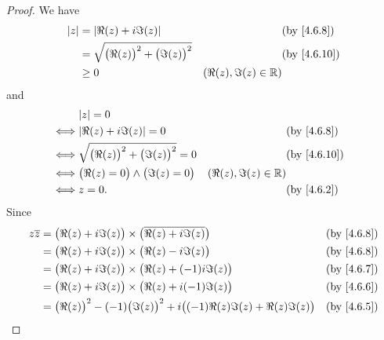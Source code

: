 \begin{proof}
  We have
  \begin{align*}
    \abs{z} & = \abs{\Re(z) + i \Im(z)}                        &                         & \text{(by \cref{4.6.8})}  \\
            & = \sqrt{\big(\Re(z)\big)^2 + \big(\Im(z)\big)^2} &                         & \text{(by \cref{4.6.10})} \\
            & \geq 0                                           & (\Re(z), \Im(z) \in \R)
  \end{align*}
  and
  \begin{align*}
         & \abs{z} = 0                                                                                              \\
    \iff & \abs{\Re(z) + i \Im(z)} = 0                        &                         & \text{(by \cref{4.6.8})}  \\
    \iff & \sqrt{\big(\Re(z)\big)^2 + \big(\Im(z)\big)^2} = 0 &                         & \text{(by \cref{4.6.10})} \\
    \iff & \big(\Re(z) = 0\big) \land \big(\Im(z) = 0\big)    & (\Re(z), \Im(z) \in \R)                             \\
    \iff & z = 0.                                             &                         & \text{(by \cref{4.6.2})}
  \end{align*}
  Since
  \begin{align*}
    z \overline{z} & = \big(\Re(z) + i \Im(z)\big) \times \big(\overline{\Re(z) + i \Im(z)}\big)                     &                                         & \text{(by \cref{4.6.8})}  \\
                   & = \big(\Re(z) + i \Im(z)\big) \times \big(\Re(z) - i \Im(z)\big)                                &                                         & \text{(by \cref{4.6.8})}  \\
                   & = \big(\Re(z) + i \Im(z)\big) \times \big(\Re(z) + (-1) i \Im(z)\big)                           &                                         & \text{(by \cref{4.6.7})}  \\
                   & = \big(\Re(z) + i \Im(z)\big) \times \big(\Re(z) + i (-1) \Im(z)\big)                           &                                         & \text{(by \cref{4.6.6})}  \\
                   & = \big(\Re(z)\big)^2 - (-1) \big(\Im(z)\big)^2 + i \big((-1) \Re(z) \Im(z) + \Re(z) \Im(z)\big) &                                         & \text{(by \cref{4.6.5})}  \\

\end{align*}
\end{proof}

